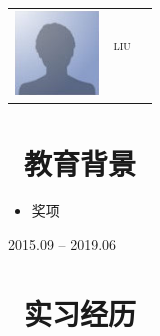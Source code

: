 \documentclass{resume}
\begin{document}

{
\Large{
 \begin{onehalfspacing}
 \begin{tabu}{c l l}
   \hspace{1em}
 	& \\
 	\vspace{1ex}
    & \huge{\scshape{liu}}\\
    &  
    &  \\
    &  &
    \hspace{2em} {\textit{}} \\
    & \\
  \end{tabu}
   \end{onehalfspacing}
	}
} 
\vspace{-4ex}
\section{\faGraduationCap\  教育背景}
\begin{onehalfspacing}
\begin{itemize}
  \item 奖项
\end{itemize}
\end{onehalfspacing}
 {2015.09 -- 2019.06}
\begin{onehalfspacing}
\end{onehalfspacing}

\section{\faUsers\ 实习经历}
\
\vspace{-2ex}
\begin{onehalfspacing}
\end{onehalfspacing}
\end{document}
